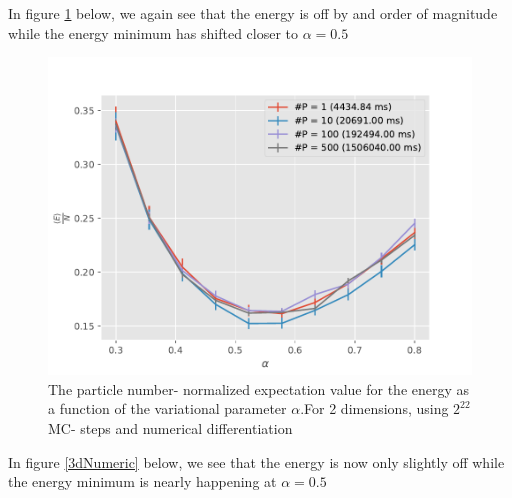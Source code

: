 \documentclass[11pt,a4paper,titlepage]{article}
\begin{document}
In figure \ref{2dNumeric} below, we again see that the energy is off by and order of magnitude while the energy minimum has shifted closer to $\alpha = 0.5$
\begin{figure}[H]
\centering

\includegraphics[trim=0cm 0.0cm 0cm 1.0cm, clip=true,scale = 0.7]{HarmonicOscillator_SimpleGaussianNumerical_D2_2pow22_numerical_NoTitle.pdf}
\caption[Numerical No interaction (2D)]{The particle number- normalized expectation value for the energy as a function of the variational parameter $\alpha$.For 2 dimensions, using $2^{22}$ MC- steps and numerical differentiation}\label{2dNumeric}
\end{figure}

In figure \ref{3dNumeric} below, we see that the energy is now only slightly off while the energy minimum is nearly happening at $\alpha = 0.5$ 
\end{document}
